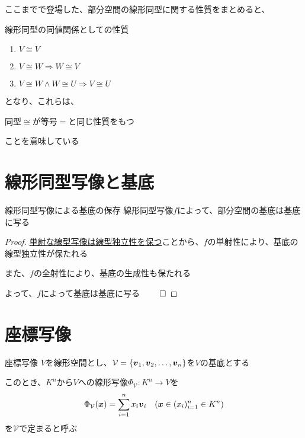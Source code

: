 \documentclass[../../../topic_linear-algebra]{subfiles}
\begin{document}
\sectionline

ここまでで登場した、部分空間の線形同型に関する性質をまとめると、

\begin{theorem}{線形同型の同値関係としての性質}
  \begin{enumerate}[label=\romanlabel]
    \item $V \cong V$
    \item $V \cong W \Longrightarrow W \cong V$
    \item $V \cong W \land W \cong U \Longrightarrow V \cong U$
  \end{enumerate}
\end{theorem}

となり、これらは、
\begin{shaded}
  同型$\cong$が等号$=$と同じ性質をもつ
\end{shaded}
ことを意味している

\sectionline
\section{線形同型写像と基底}

\begin{theorem}{線形同型写像による基底の保存}
  線形同型写像$f$によって、部分空間の基底は基底に写る
\end{theorem}

\begin{proof}
  \hyperref[thm:injective-preserves-independence]{単射な線型写像は線型独立性を保つ}ことから、$f$の単射性により、基底の線型独立性が保たれる

  また、$f$の全射性により、基底の生成性も保たれる

  よって、$f$によって基底は基底に写る $\qed$
\end{proof}

\sectionline
\section{座標写像}

\begin{mindflow}
\end{mindflow}

\begin{definition}{座標写像}\label{def:coordinate-mapping}
  $V$を線形空間とし、$\mathcal{V} = \{ \vb*{v}_1, \vb*{v}_2, \dots, \vb*{v}_n \}$を$V$の基底とする

  このとき、$K^n$から$V$への線形写像$\Phi_{\mathcal{V}}\colon K^n \to V$を
  \begin{equation*}
    \Phi_{\mathcal{V}}(\vb*{x}) = \sum_{i=1}^n x_i \vb*{v}_i \quad (\vb*{x} \in (x_i)_{i=1}^n \in K^n)
  \end{equation*}
  を$\mathcal{V}$で定まると呼ぶ
\end{definition}
\end{document}
